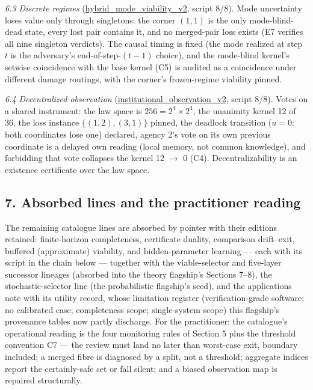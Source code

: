 \documentclass[10pt,twocolumn]{article}
\theoremstyle{definition}
\begin{document}
\emph{6.3 Discrete regimes}
(\url{hybrid_mode_viability_v2}, script 8/8). Mode uncertainty loses
value only through singletons: the corner \((1,1)\) is the only mode-blind-dead
state, every lost pair contains it, and no merged-pair loss exists (E7
verifies all nine singleton verdicts). The causal timing is fixed (the mode
realized at step \(t\) is the adversary's end-of-step-\((t-1)\) choice), and
the mode-blind kernel's setwise coincidence with the base kernel (C5) is
audited as a coincidence under different damage routings, with the corner's
frozen-regime viability pinned.

\emph{6.4 Decentralized observation}
(\url{institutional_observation_v2}, script 8/8). Votes on a shared
instrument: the law space is \(256 = 2^4 \times 2^4\), the unanimity kernel
12 of 36, the loss instance \(\{(1,2),(3,1)\}\) pinned, the deadlock
transition (\(u = 0\): both coordinates lose one) declared, agency 2's vote
on its own previous coordinate is a delayed own reading (local memory, not
common knowledge), and forbidding that vote collapses the kernel 12 \(\to\)
0 (C4). Decentralizability is an existence certificate over the law space.

\subsection{7. Absorbed lines and the practitioner reading}\label{absorbed}

The remaining catalogue lines are absorbed by pointer with their editions
retained: finite-horizon completeness, certificate duality, comparison
drift--exit, buffered (approximate) viability, and hidden-parameter learning
--- each with its script in the chain below --- together with the viable-selector
and five-layer successor lineages (absorbed into the theory flagship's
Sections 7--8), the stochastic-selector line (the probabilistic flagship's
seed), and the applications note with its utility record, whose limitation
register (verification-grade software; no calibrated case; completeness
scope; single-system scope) this flagship's provenance tables now partly
discharge. For the practitioner: the catalogue's operational reading is the
four monitoring rules of Section 5 plus the threshold convention C7 --- the
review must land no later than worst-case exit, boundary included; a merged
fibre is diagnosed by a split, not a threshold; aggregate indices report the
certainly-safe set or fall silent; and a biased observation map is repaired
structurally.
\end{document}
